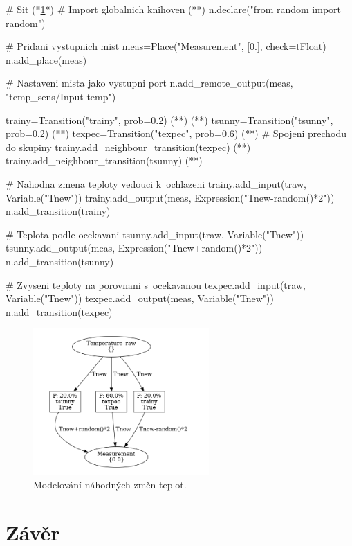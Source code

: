 \begin{python}
 # Sit (*\ref{prob-ev-viz}*)
 # Import globalnich knihoven (*\label{code:prob-ev-draw}*)
 n.declare("from random import random")

 # Pridani vystupnich mist
 meas=Place("Measurement", [0.], check=tFloat)
 n.add_place(meas)

 # Nastaveni mista jako vystupni port
 n.add_remote_output(meas, "temp_sens/Input temp")

 trainy=Transition("trainy", prob=0.2) (*\label{code:prob-temp-example}*) (*\label{code:trainy}*)
 tsunny=Transition("tsunny", prob=0.2) (*\label{code:tsunny}*)
 texpec=Transition("texpec", prob=0.6) (*\label{code:texpec}*)
 # Spojeni prechodu do skupiny
 trainy.add_neighbour_transition(texpec) (*\label{code:prob-temp-neghb-example-1}*)
 trainy.add_neighbour_transition(tsunny) (*\label{code:prob-temp-neghb-example-2}*)

 # Nahodna zmena teploty vedouci k~ochlazeni
 trainy.add_input(traw, Variable("Tnew"))
 trainy.add_output(meas, Expression("Tnew-random()*2"))
 n.add_transition(trainy)

 # Teplota podle ocekavani
 tsunny.add_input(traw, Variable("Tnew"))
 tsunny.add_output(meas, Expression("Tnew+random()*2"))
 n.add_transition(tsunny)

 # Zvyseni teploty na porovnani s~ocekavanou
 texpec.add_input(traw, Variable("Tnew"))
 texpec.add_output(meas, Variable("Tnew"))
 n.add_transition(texpec)
\end{python}

\begin{figure}[htb]
 \centering
 \includegraphics[width=0.6\textwidth]{obrazky-figures/measure.png}
 \caption{Modelování náhodných změn teplot.}
 \label{prob-ev-viz}
\end{figure}

\chapter{Závěr}
\label{chap:zaver}

